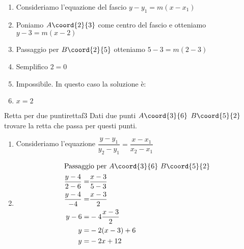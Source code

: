 \begin{enumerate}
	\item Consideriamo l'equazione del fascio $y-y_1=m(x-x_1)$
	\item Poniamo  $A\coord{2}{3}$ come centro del fascio e otteniamo $y-3=m(x-2)$
	\item Passaggio per $B\coord{2}{5}$ otteniamo $5-3=m(2-3)$
	\item Semplifico $2=0$
	\item Impossibile. In questo caso la soluzione è:
	\item $x=2$
\end{enumerate}
\begin{esempiot}{Retta per due punti}{rettaf3}
	Dati due punti $A\coord{3}{6}$ $B\coord{5}{2}$ trovare la retta che passa per questi punti.
\end{esempiot}
\begin{enumerate}
	\item Consideriamo l'equazione  $\dfrac{y-y_1}{y_2-y_1}=\dfrac{x-x_1}{x_2-x_1}$
	\item \begin{align*}
		\intertext{Passaggio per $A\coord{3}{6}$ $B\coord{5}{2}$ }
	\dfrac{y-4}{2-6}=&\dfrac{x-3}{5-3}\\
	\dfrac{y-4}{-4}=&\dfrac{x-3}{2}\\
		y-6=&-4\dfrac{x-3}{2}\\
		y=&-2(x-3)+6\\
		y=&-2x+12
	\end{align*}
\end{enumerate}
